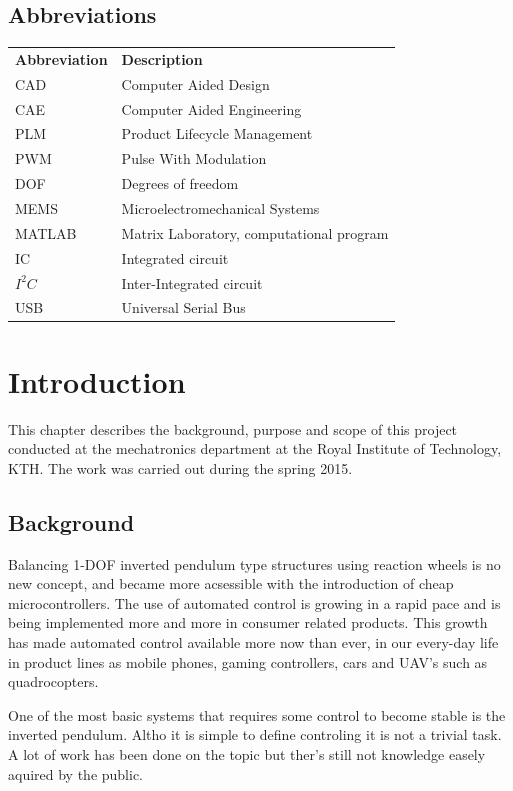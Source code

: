 \documentclass[a4paper,11pt]{kth-mag}
\begin{document}
\section*{Abbreviations}
\noindent{}\begin{tabular}{@{}p{2.5cm}l}
\textbf{Abbreviation} 	& \textbf{Description} \vspace{.5em} \\
CAD			& Computer Aided Design \\
CAE			& Computer Aided Engineering\\
PLM			& Product Lifecycle Management\\
PWM			& Pulse With Modulation\\
DOF			& Degrees of freedom\\
MEMS			& Microelectromechanical Systems \\
MATLAB		& Matrix Laboratory, computational program\\
IC			& Integrated circuit\\
$I^2C$		& Inter-Integrated circuit\\
USB			& Universal Serial Bus \\

\end{tabular}
\cleardoublepage

\mainmatter
\pagestyle{newchap}

\chapter{Introduction}
This chapter describes the background, purpose and scope of this project conducted at the mechatronics department at the Royal Institute of Technology, KTH. The work was carried out during the spring 2015.

\section{Background}
Balancing 1-DOF inverted pendulum type structures using reaction wheels is no
new concept, and became more acsessible with the introduction of cheap microcontrollers.
The use of automated control is growing in a rapid pace and is being implemented
more and more in consumer related products.  This growth
has made automated control available more now than ever, in our every-day life in
product lines as mobile phones, gaming controllers, cars and UAV’s such as quadrocopters.

One of the most basic systems that requires some control to become stable is the inverted pendulum. 
Altho it is simple to define controling it is not a trivial task. A lot of work has been done on the topic
but ther's still not knowledge easely aquired by the public. 
\end{document}
